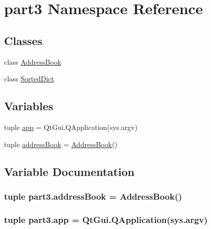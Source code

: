 \hypertarget{namespacepart3}{}\section{part3 Namespace Reference}
\label{namespacepart3}
\subsection*{Classes}
\begin{DoxyCompactItemize}
\item 
class \hyperlink{classpart3_1_1AddressBook}{Address\+Book}
\item 
class \hyperlink{classpart3_1_1SortedDict}{Sorted\+Dict}
\end{DoxyCompactItemize}
\subsection*{Variables}
\begin{DoxyCompactItemize}
\item 
tuple \hyperlink{namespacepart3_a043da8b710fbba441be61c8752923bcc}{app} = Qt\+Gui.\+Q\+Application(sys.\+argv)
\item 
tuple \hyperlink{namespacepart3_a207d60f3f13e2a8557bc70fd3a0d58c5}{address\+Book} = \hyperlink{classpart3_1_1AddressBook}{Address\+Book}()
\end{DoxyCompactItemize}


\subsection{Variable Documentation}
\hypertarget{namespacepart3_a207d60f3f13e2a8557bc70fd3a0d58c5}{}
\subsubsection[{address\+Book}]{\setlength{\rightskip}{0pt plus 5cm}tuple part3.\+address\+Book = {\bf Address\+Book}()}\label{namespacepart3_a207d60f3f13e2a8557bc70fd3a0d58c5}
\hypertarget{namespacepart3_a043da8b710fbba441be61c8752923bcc}{}
\subsubsection[{app}]{\setlength{\rightskip}{0pt plus 5cm}tuple part3.\+app = Qt\+Gui.\+Q\+Application(sys.\+argv)}\label{namespacepart3_a043da8b710fbba441be61c8752923bcc}
